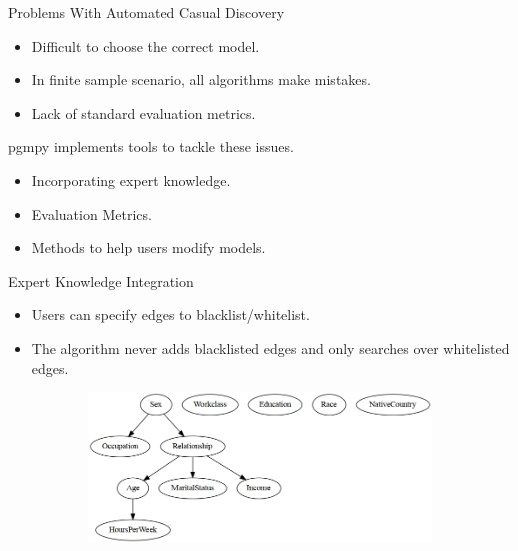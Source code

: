 \documentclass{beamer}
\begin{document}
\begin{frame}{Problems With Automated Casual Discovery}
	\begin{itemize}
		\item Difficult to choose the correct model.
		\item In finite sample scenario, all algorithms make mistakes.
		\item Lack of standard evaluation metrics.
	\end{itemize}

	\vspace{2em}

	pgmpy implements tools to tackle these issues. 
	\begin{itemize}
		\item Incorporating expert knowledge.
		\item Evaluation Metrics.
		\item Methods to help users modify models.
	\end{itemize}
\end{frame}

\begin{frame}{Expert Knowledge Integration}
	\begin{itemize}
		\item Users can specify edges to blacklist/whitelist.
		\item The algorithm never adds blacklisted edges and only
			searches over whitelisted edges.
	\end{itemize}
	\begin{figure}
		\begin{subfigure}{0.5 \textwidth}
		\end{subfigure}%
		\begin{subfigure}{0.5 \textwidth}
			\centering
			\includegraphics[scale=0.3]{imgs/adult_bic_blacklist.png}
		\end{subfigure}
	\end{figure}
\end{frame}
\end{document}
